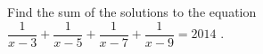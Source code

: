 Find the sum of the solutions to the equation $\dfrac{1}{x-3} + \dfrac{1}{x-5} + \dfrac{1}{x-7} + \dfrac{1}{x-9} = 2014$ .
